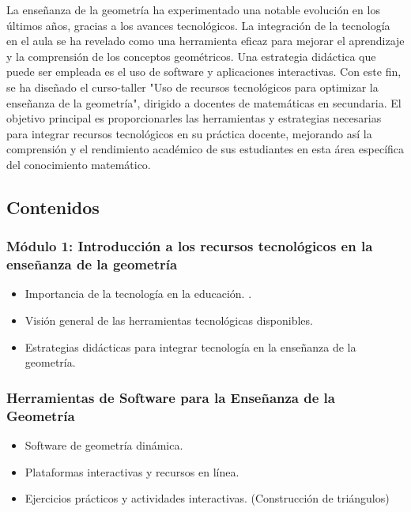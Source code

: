 La enseñanza de la geometría ha experimentado una notable evolución en los últimos años, gracias a los avances tecnológicos. La integración de la tecnología en el aula se ha revelado como una herramienta eficaz para mejorar el aprendizaje y la comprensión de los conceptos geométricos. Una estrategia didáctica que puede ser empleada es el uso de software y aplicaciones interactivas. Con este fin, se ha diseñado el curso-taller "Uso de recursos tecnológicos para optimizar la enseñanza de la geometría", dirigido a docentes de matemáticas en secundaria. El objetivo principal es proporcionarles las herramientas y estrategias necesarias para integrar recursos tecnológicos en su práctica docente, mejorando así la comprensión y el rendimiento académico de sus estudiantes en esta área específica del conocimiento matemático.

\subsection{Contenidos}

\subsubsection{Módulo 1: Introducción a los recursos tecnológicos en la enseñanza de la geometría}

\begin{itemize}
	\item Importancia de la tecnología en la educación. \textcite{thomas2010}.
	\item Visión general de las herramientas tecnológicas disponibles.
	\item Estrategias didácticas para integrar tecnología en la enseñanza de la geometría.
\end{itemize}

\subsubsection{Herramientas de Software para la Enseñanza de la Geometría}

\begin{itemize}
	\item Software de geometría dinámica. \textcite{hohenwarter2015}
	\item Plataformas interactivas y recursos en línea.
	\item Ejercicios prácticos y actividades interactivas. (Construcción de triángulos)
\end{itemize}

